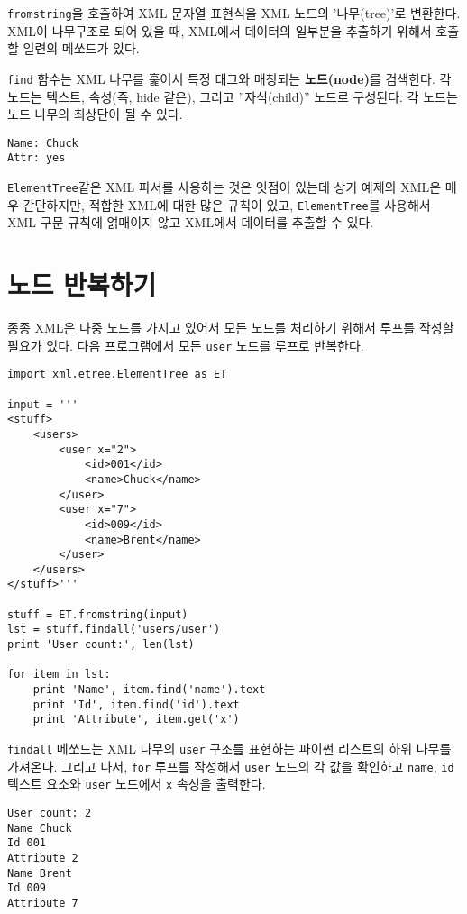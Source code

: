 {\tt fromstring}을 호출하여 XML 문자열 표현식을 XML 노드의 '나무(tree)'로 변환한다.
XML이 나무구조로 되어 있을 때, XML에서 데이터의 일부분을 추출하기 위해서 호출할 일련의 메쏘드가 있다.

{\tt find} 함수는 XML 나무를 훑어서 특정 태그와 매칭되는 {\bf 노드(node)}를 검색한다. 
각 노드는 텍스트, 속성(즉, hide 같은), 그리고 ''자식(child)'' 노드로 구성된다. 각 노드는 노드 나무의 최상단이 될 수 있다.

\beforeverb
\begin{verbatim}
Name: Chuck
Attr: yes
\end{verbatim}
\afterverb
%

{\tt ElementTree}같은 XML 파서를 사용하는 것은 잇점이 있는데 상기 예제의 XML은 매우 간단하지만,
적합한 XML에 대한 많은 규칙이 있고, {\tt ElementTree}를 사용해서 XML 구문 규칙에 얽매이지 않고 XML에서
데이터를 추출할 수 있다.

\section{노드 반복하기}


종종 XML은 다중 노드를 가지고 있어서 모든 노드를 처리하기 위해서 루프를 작성할 필요가 있다.
다음 프로그램에서 모든 {\tt user} 노드를 루프로 반복한다.

\beforeverb
\begin{verbatim}
import xml.etree.ElementTree as ET

input = '''
<stuff>
    <users>
        <user x="2">
            <id>001</id>
            <name>Chuck</name>
        </user>
        <user x="7">
            <id>009</id>
            <name>Brent</name>
        </user>
    </users>
</stuff>'''

stuff = ET.fromstring(input)
lst = stuff.findall('users/user')
print 'User count:', len(lst)

for item in lst:
    print 'Name', item.find('name').text
    print 'Id', item.find('id').text
    print 'Attribute', item.get('x')
\end{verbatim}
\afterverb
%

{\tt findall} 메쏘드는 XML 나무의 {\tt user} 구조를 표현하는 파이썬 리스트의 하위 나무를 가져온다.
그리고 나서, {\tt for} 루프를 작성해서 {\tt user} 노드의 각 값을 확인하고 {\tt name}, {\tt id} 텍스트 요소와 
{\tt user} 노드에서 {\tt x} 속성을 출력한다.

\beforeverb
\begin{verbatim}
User count: 2
Name Chuck
Id 001
Attribute 2
Name Brent
Id 009
Attribute 7
\end{verbatim}
\afterverb
%

